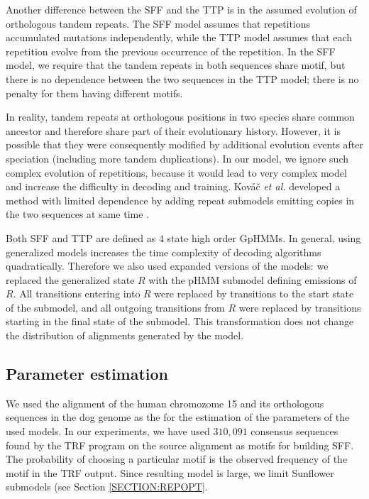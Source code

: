 Another difference between the SFF and the TTP is in the assumed evolution of
orthologous tandem repeats.  The SFF model assumes that repetitions accumulated
mutations independently, while the TTP model assumes that each repetition
evolve from the previous occurrence of the repetition. In the SFF model, we
require that the tandem repeats in both sequences share motif, but there is no
dependence between the two sequences in the TTP model; there is no penalty for
them having different motifs.

In reality, tandem repeats at orthologous positions in two species share common
ancestor and therefore share part of their evolutionary history. However, it is
possible that they were consequently modified by additional evolution events
after speciation (including more tandem duplications). In our model, we ignore
such complex evolution of repetitions, because it would lead to very complex
model and increase the difficulty in decoding and training. Kováč {\it et al.}
developed a method with limited dependence by adding repeat submodels emitting
copies in the two sequences at same time \cite{Kovac2012}.

Both SFF and TTP are defined as $4$ state high order GpHMMs.  In general, using
generalized models increases the time complexity of decoding algorithms
quadratically. Therefore we also used expanded versions of the models: we
replaced the generalized state $R$ with the pHMM submodel defining emissions of
$R$. All transitions entering into $R$ were replaced by transitions to the
start state of the submodel, and all outgoing transitions from $R$ were
replaced by transitions starting in the final state of the submodel. This
transformation does not change the distribution of alignments generated by the
model.  

\subsection{Parameter estimation}\label{SECTION:ALNPAREST}
We used the alignment of the human chromozome 15 and its orthologous sequences
in the dog genome as the  for the estimation of
the parameters of the used models.
In our experiments, we have used $310,091$ consensus sequences found by the TRF
program on the source alignment as motifs for building SFF.  The probability of choosing a particular
motif is the observed frequency of the motif in the TRF output. Since resulting
model is large, we limit Sunflower submodels (see Section \ref{SECTION:REPOPT}.

